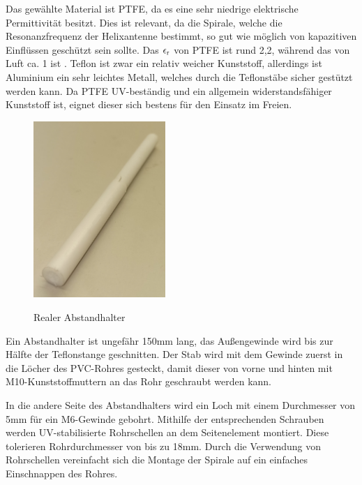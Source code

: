 Das gewählte Material ist PTFE, da es eine sehr niedrige elektrische Permittivität besitzt. Dies ist relevant, da die Spirale, welche die Resonanzfrequenz der Helixantenne bestimmt, so gut wie möglich von kapazitiven Einflüssen geschützt sein sollte. Das $\epsilon\textsubscript{r}$ von PTFE ist rund 2,2, während das von Luft ca. 1 ist \cite{lipinski_polytetrafluorethylen_nodate,noauthor_dielektrizitatskonstante_nodate}. Teflon ist zwar ein relativ weicher Kunststoff, allerdings ist Aluminium ein sehr leichtes Metall, welches durch die Teflonstäbe sicher gestützt werden kann. Da PTFE UV-beständig und ein allgemein widerstandsfähiger Kunststoff ist, eignet dieser sich bestens für den Einsatz im Freien.

\begin{figure}[H]
	\centering
	\includegraphics[width=5cm]{../ref/Abstandhalter-real.jpg}
	\label{fig:Abstandhalter-real}
	\caption{Realer Abstandhalter}
\end{figure}

Ein Abstandhalter ist ungefähr 150mm lang, das Außengewinde wird bis zur Hälfte der Teflonstange geschnitten. Der Stab wird mit dem Gewinde zuerst in die Löcher des PVC-Rohres gesteckt, damit dieser von vorne und hinten mit M10-Kunststoffmuttern an das Rohr geschraubt werden kann.

In die andere Seite des Abstandhalters wird ein Loch mit einem Durchmesser von 5mm für ein M6-Gewinde gebohrt. Mithilfe der entsprechenden Schrauben werden UV-stabilisierte Rohrschellen an dem Seitenelement montiert. Diese tolerieren Rohrdurchmesser von bis zu 18mm. Durch die Verwendung von Rohrschellen vereinfacht sich die Montage der Spirale auf ein einfaches Einschnappen des Rohres.

